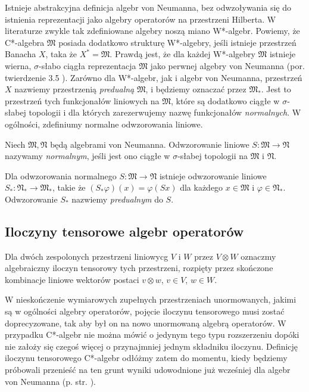 Istnieje abstrakcyjna definicja algebr von Neumanna, bez odwzoływania się
do istnienia reprezentacji jako algebry operatorów na przestrzeni Hilberta.
W literaturze zwykle tak zdefiniowane algebry noszą miano W*-algebr.
Powiemy, że C*-algebra $\mathfrak{M}$ posiada dodatkowo strukturę W*-algebry,
jeśli istnieje przestrzeń Banacha $X$, taka że
$X^{*} = \mathfrak{M}$.
Prawdą jest, że dla każdej W*-algebry $\mathfrak{M}$ istnieje wierna,
$\sigma$-słabo ciągła reprezentacja $\mathfrak{M}$ jako perwnej algebry von Neumanna
(por. twierdzenie 3.5 \cite{Takesaki1}).
Zarówno dla W*-algebr, jak i algebr von Neumanna,
przestrzeń $X$ nazwiemy przestrzenią \emph{predualną} $\mathfrak{M}$,
i będziemy oznaczać przez $\mathfrak{M}_{*}$.
Jest to przestrzeń tych funkcjonałów liniowych na $\mathfrak{M}$, które
są dodatkowo ciągłe w $\sigma$-słabej topologii i dla których zarezerwujemy
nazwę funkcjonałów \emph{normalnych}.
W ogólności, zdefiniumy normalne odwzorowania liniowe.
\begin{Definition}
    \label{def:normalMap}
    Niech $\mathfrak{M}, \mathfrak{N}$ będą algebrami von Neumanna.
    Odwzorowanie liniowe $S: \mathfrak{M} \rightarrow \mathfrak{N}$
    nazywamy \emph{normalnym}, jeśli
    jest ono ciągłe w $\sigma$-słabej topologii na $\mathfrak{M}$ i $\mathfrak{N}$.
\end{Definition}
Dla odwzorowania normalnego $S: \mathfrak{M} \rightarrow \mathfrak{N}$
istnieje odwzorowanie liniowe $S_{*}: \mathfrak{N}_{*} \rightarrow \mathfrak{M}_{*}$,
takie że $(S_{*} \varphi) (x) = \varphi(Sx)$ dla każdego
$x \in \mathfrak{M}$ i $\varphi \in \mathfrak{N}_*$.
Odwzorowanie $S_{*}$ nazwiemy \emph{predualnym} do $S$.


\subsection{Iloczyny tensorowe algebr operatorów}
Dla dwóch zespolonych przestrzeni liniowycg $V$ i $W$ przez
$V \! \otimes \! W$ oznaczmy algebraiczny iloczyn tensorowy tych przestrzeni,
rozpięty przez skończone kombinacje liniowe wektorów postaci
$v \otimes w$, $v \in V$, $w \in W$.

W nieskończenie wymiarowych zupełnych przestrzeniach unormowanych,
jakimi są w ogólności algebry operatorów,
pojęcie iloczynu tensorowego musi zostać doprecyzowane, tak aby
był on na nowo unormowaną algebrą operatorów.
W przypadku C*-algebr nie można mówić o jedynym tego typu rozszerzeniu
dopóki nie założy się czegoś więcej o przynajmniej jednym składniku iloczynu.
Definicję iloczynu tensorowego C*-algebr odłóżmy zatem do momentu,
kiedy będziemy próbowali przenieść na ten grunt wyniki udowodnione już
wcześniej dla algebr von Neumanna (p. str. \pageref{sec:HorCstar}).


